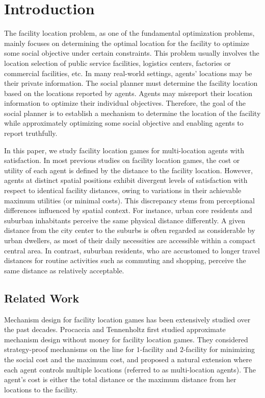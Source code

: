 \documentclass[runningheads]{11llncst}
\begin{document}



\section{Introduction}
The facility location problem, as one of the fundamental optimization problems, mainly focuses on determining the optimal location for the facility to optimize some social objective under certain constraints. This problem usually involves the location selection of public service facilities, logistics centers, factories or commercial facilities, etc. In many real-world settings, agents' locations may be their private information. The social planner must determine the facility location based on the locations reported by agents. Agents may misreport their location information to optimize their individual objectives. Therefore, the goal of the social planner is to establish a mechanism to determine the location of the facility while approximately optimizing some social objective and enabling agents to report truthfully. 

In this paper, we study facility location games for multi-location agents with satisfaction. In most previous studies on facility location games, the cost or utility of each agent is defined by the distance to the facility location. However, agents at distinct spatial positions exhibit divergent levels of satisfaction with respect to identical facility distances, owing to variations in their achievable maximum utilities (or minimal costs). This discrepancy stems from perceptional differences influenced by spatial context. For instance, urban core residents and suburban inhabitants perceive the same physical distance differently. A given distance from the city center to the suburbs is often regarded as considerable by urban dwellers, as most of their daily necessities are accessible within a compact central area. In contrast, suburban residents, who are accustomed to longer travel distances for routine activities such as commuting and shopping, perceive the same distance as relatively acceptable.

\vspace{-0.3cm}

\subsection{Related Work} 
Mechanism design for facility location games has been extensively studied over the past decades.
Procaccia and Tennenholtz \cite{procaccia2009approximate} first studied approximate mechanism design without money for facility location games. They considered strategy-proof mechanisms on the line for $1$-facility and $2$-facility for minimizing the social cost and the maximum cost, and proposed a natural extension where each agent controls multiple locations (referred to as multi-location agents). The agent's cost  is either the total distance or the maximum distance from her locations to the facility. 
\end{document}
